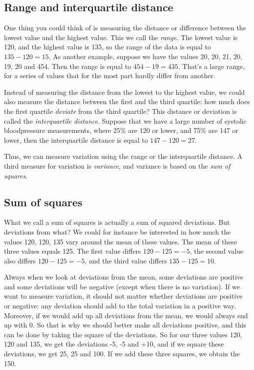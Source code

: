 \documentclass[]{book}\usepackage[]{graphicx}\usepackage[]{color}
\begin{document}
\subsection{Range and interquartile distance}

One thing you could think of is measuring the distance or difference between the lowest value and the highest value. This we call the \textit{range}. The lowest value is 120, and the highest value is 135, so the range of the data is equal to $135-120=15$. As another example, suppose we have the values 20, 20, 21, 20, 19, 20 and 454. Then the range is equal to $454-19=435$. That's a large range, for a series of values that for the most part hardly differ from another.

Instead of measuring the distance from the lowest to the highest value, we could also measure the distance between the first and the third quartile: how much does the first quartile \textit{deviate} from the third quartile? This distance or deviation is called the \textit{interquartile distance}. Suppose that we have a large number of systolic bloodpressure measurements, where 25\% are 120 or lower, and 75\% are 147 or lower, then the interquartile distance is equal to $147-120=27$.

Thus, we can measure variation using the range or the interquartile distance. A third measure for variation is \textit{variance}, and variance is based on the \textit{sum of squares}.

\subsection{Sum of squares}

What we call a sum of squares is actually a sum of squared deviations. But deviations from what? We could for instance be interested in how much the values 120, 120, 135 vary around the mean of these values. The mean of these three values equals 125. The first value differs $120-125= -5$, the second value also differs $120-125= -5$, and the third value differs $135-125= 10$.

Always when we look at deviations from the mean, some deviations are positive and some deviations will be negative (except when there is no variation). If we want to measure variation, it should not matter whether deviations are positive or negative: any deviation should add to the total variation in a positive way. Moreover, if we would add up all deviations from the mean, we would always end up with 0. So that is why we should better make all deviations positive, and this can be done by taking the square of the deviations. So for our three values 120, 120 and 135, we get the deviations -5, -5 and +10, and if we square these deviations, we get 25, 25 and 100. If we add these three squares, we obtain the 150.
\end{document}
